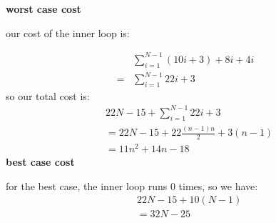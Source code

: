 \documentclass{article}
\begin{document}
\textbf{worst case cost}

our cost of the inner loop is:

\begin{align*}
&\sum_{i=1}^{N-1} (10i + 3) + 8i + 4i\\
=&\sum_{i=1}^{N-1} 22i + 3
\end{align*}
so our total cost is:
\begin{align*}
& 22N - 15 + \sum_{i=1}^{N-1} 22i + 3\\
&= 22N - 15 + 22\frac{(n-1)n}{2} + 3 (n-1)\\
&= 11n^2 + 14n - 18
\end{align*}
\textbf{best case cost}

\vspace{5mm}
for the best case, the inner loop runs 0 times, so we have:
\begin{align*}
& 22N - 15 + 10(N-1)\\
&= 32N - 25
\end{align*}
\end{document}
